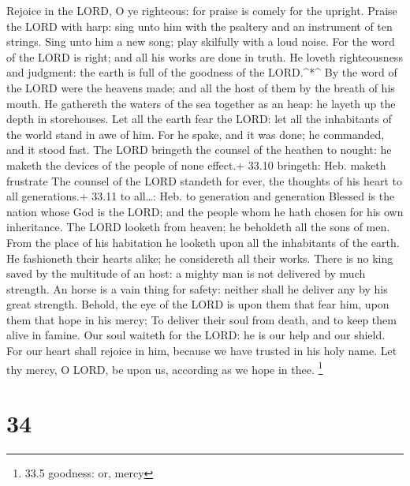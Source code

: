  Rejoice in the LORD, O ye righteous: for praise is comely
for the upright.  Praise the LORD with harp: sing unto him
with the psaltery and an instrument of ten strings.  Sing
unto him a new song; play skilfully with a loud noise.  For
the word of the LORD is right; and all his works are done in truth.
 He loveth righteousness and judgment: the earth is full of
the goodness of the LORD.\^{}*\^{}  By the word of the LORD
were the heavens made; and all the host of them by the breath of his
mouth.  He gathereth the waters of the sea together as an
heap: he layeth up the depth in storehouses.  Let all the
earth fear the LORD: let all the inhabitants of the world stand in awe
of him.  For he spake, and it was done; he commanded, and it
stood fast.  The LORD bringeth the counsel of the heathen
to nought: he maketh the devices of the people of none effect.+ 33.10
bringeth: Heb. maketh frustrate  The counsel of the LORD
standeth for ever, the thoughts of his heart to all generations.+ 33.11
to all\ldots: Heb. to generation and generation  Blessed is
the nation whose God is the LORD; and the people whom he hath chosen for
his own inheritance.  The LORD looketh from heaven; he
beholdeth all the sons of men.  From the place of his
habitation he looketh upon all the inhabitants of the earth.
 He fashioneth their hearts alike; he considereth all their
works.  There is no king saved by the multitude of an host:
a mighty man is not delivered by much strength.  An horse
is a vain thing for safety: neither shall he deliver any by his great
strength.  Behold, the eye of the LORD is upon them that
fear him, upon them that hope in his mercy;  To deliver
their soul from death, and to keep them alive in famine. 
Our soul waiteth for the LORD: he is our help and our shield.
 For our heart shall rejoice in him, because we have
trusted in his holy name.  Let thy mercy, O LORD, be upon
us, according as we hope in thee. \footnote{33.5 goodness: or, mercy}

\hypertarget{section-33}{%
\section{34}\label{section-33}}

